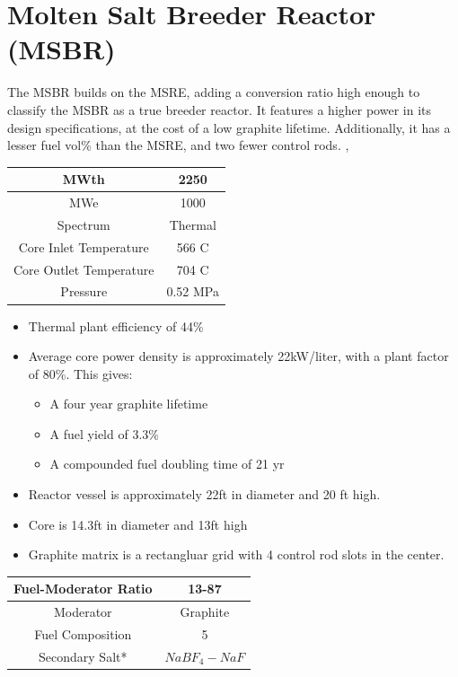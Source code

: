 \documentclass[letterpaper]{article}
\begin{document}
\section{Molten Salt Breeder Reactor (MSBR)}
The MSBR builds on the MSRE, adding a conversion ratio high enough to classify the MSBR as a true breeder reactor.  It features a higher power in its design specifications, at the cost of a low graphite lifetime.  Additionally, it has a lesser fuel vol\% than the MSRE, and two fewer control rods. \cite{bettis_design_1970}, \cite{whatley_engineering_1970}

\begin{center}
\begin{tabular}{|c|c|}
\hline
MWth & 2250 \\
\hline
MWe & 1000 \\
\hline
Spectrum & Thermal \\
\hline
Core Inlet Temperature & 566 C \\
\hline
Core Outlet Temperature & 704 C\\
\hline
Pressure & 0.52 MPa \\
\hline
\end{tabular}
\end{center}

\begin{itemize}
\item Thermal plant efficiency of 44\%
\item Average core power density is approximately 22kW/liter, with a plant factor of 80\%.  This gives:
	\begin{itemize}
	\item A four year graphite lifetime
	\item A fuel yield of 3.3\%
	\item A compounded fuel doubling time of 21 yr
	\end{itemize}
\item Reactor vessel is approximately 22ft in diameter and 20 ft high.
\item Core is 14.3ft in diameter and 13ft high
\item Graphite matrix is a rectangluar grid with 4 control rod slots in the center.
\end{itemize}

\begin{center}
\begin{tabular}{|c|c|}
\hline
Fuel-Moderator Ratio & 13-87 \\
\hline
Moderator & Graphite \\
\hline
Fuel Composition & 5 \\
\hline
Secondary Salt* & $NaBF_4-NaF$ \\
\hline
\end{tabular}
\end{center}
\end{document}
